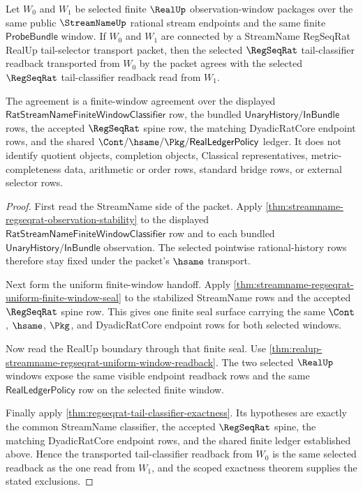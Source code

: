 \begin{theorem}
\label{thm:streamname-regseqrat-realup-tail-selector-transport}
Let $W_0$ and $W_1$ be selected finite $\RealUp$ observation-window packages
over the same public $\StreamNameUp$ rational stream endpoints and the same
finite $\mathsf{ProbeBundle}$ window. If $W_0$ and $W_1$ are connected by a
StreamName RegSeqRat RealUp tail-selector transport packet, then the selected
$\RegSeqRat$ tail-classifier readback transported from $W_0$ by the packet
agrees with the selected $\RegSeqRat$ tail-classifier readback read from
$W_1$.

The agreement is a finite-window agreement over the displayed
$\mathsf{RatStreamNameFiniteWindowClassifier}$ row, the bundled
$\mathsf{UnaryHistory}/\mathsf{InBundle}$ rows, the accepted $\RegSeqRat$
spine row, the matching DyadicRatCore endpoint rows, and the shared
$\Cont/\hsame/\Pkg/\mathsf{RealLedgerPolicy}$ ledger. It does not identify
quotient objects, completion objects, Classical representatives,
metric-completeness data, arithmetic or order rows, standard bridge rows, or
external selector rows.
\end{theorem}
\begin{proof}
First read the StreamName side of the packet. Apply
\autoref{thm:streamname-regseqrat-observation-stability} to the displayed
$\mathsf{RatStreamNameFiniteWindowClassifier}$ row and to each bundled
$\mathsf{UnaryHistory}/\mathsf{InBundle}$ observation. The selected pointwise
rational-history rows therefore stay fixed under the packet's $\hsame$
transport.

Next form the uniform finite-window handoff. Apply
\autoref{thm:streamname-regseqrat-uniform-finite-window-seal} to the stabilized
StreamName rows and the accepted $\RegSeqRat$ spine row. This gives one finite
seal surface carrying the same $\Cont$, $\hsame$, $\Pkg$, and DyadicRatCore
endpoint rows for both selected windows.

Now read the RealUp boundary through that finite seal. Use
\autoref{thm:realup-streamname-regseqrat-uniform-window-readback}. The two
selected $\RealUp$ windows expose the same visible endpoint readback rows and
the same $\mathsf{RealLedgerPolicy}$ row on the selected finite window.

Finally apply \autoref{thm:regseqrat-tail-classifier-exactness}. Its
hypotheses are exactly the common StreamName classifier, the accepted
$\RegSeqRat$ spine, the matching DyadicRatCore endpoint rows, and the shared
finite ledger established above. Hence the transported tail-classifier readback
from $W_0$ is the same selected readback as the one read from $W_1$, and the
scoped exactness theorem supplies the stated exclusions.
\end{proof}

